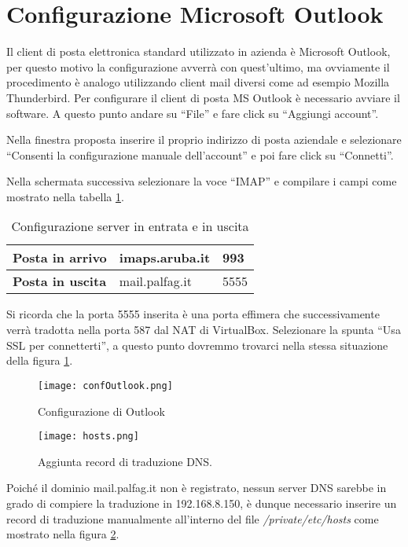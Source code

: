 \section{Configurazione Microsoft Outlook}
Il client di posta elettronica standard utilizzato in azienda è Microsoft Outlook, 
per questo motivo la configurazione avverrà con quest'ultimo, 
ma ovviamente il procedimento è analogo utilizzando client mail diversi come ad esempio Mozilla Thunderbird.
Per configurare il client di posta MS Outlook è necessario avviare il software.
A questo punto andare su ``File'' e fare click su ``Aggiungi account''.

Nella finestra proposta inserire il proprio indirizzo di posta aziendale e selezionare ``Consenti la configurazione
manuale dell'account'' e poi fare click su ``Connetti''.

Nella schermata successiva selezionare la voce ``IMAP'' e compilare i campi come mostrato nella tabella \ref{serverOUT}.


\begin{table}[htp]
    \centering
    \begin{tabular}{|l|l|l|}
    \hline
    \rowcolor[HTML]{EFEFEF} 
    \textbf{Posta in arrivo} & imaps.aruba.it & 993  \\ \hline
    \textbf{Posta in uscita} & mail.palfag.it & 5555 \\ \hline
    \end{tabular}%
    \caption{Configurazione server in entrata e in uscita}\label{serverOUT}
    \end{table}
    Si ricorda che la porta 5555 inserita è una porta effimera che successivamente verrà tradotta nella porta 587
    dal NAT di VirtualBox.
    Selezionare la spunta ``Usa SSL per connetterti'', a questo punto dovremmo trovarci nella stessa situazione
    della figura \ref{confOutlook}.

        \begin{figure}[htp]
            \centering
            \texttt{[image: confOutlook.png]}
            \caption{Configurazione di Outlook}\label{confOutlook}
        \end{figure}   
        
        \begin{figure}[htp]
          \centering
          \texttt{[image: hosts.png]}
          \caption{Aggiunta record di traduzione DNS.}\label{hosts}
      \end{figure}  
    Poiché il dominio mail.palfag.it non è registrato, 
    nessun server DNS sarebbe in grado di compiere la traduzione in 192.168.8.150, 
    è dunque necessario inserire un record di traduzione manualmente all’interno del file \textit{/private/etc/hosts} 
    come mostrato nella figura \ref{hosts}.

